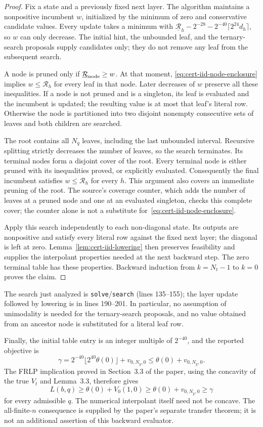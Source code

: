 \begin{proof}
Fix a state and a previously fixed next layer.  The algorithm maintains a
nonpositive incumbent $w$, initialized by the minimum of zero and
conservative candidate values.  Every update takes a minimum with
$\underline{\mathcal R}_h-2^{-28}-2^{-40}\lceil 2^{24}d_h\rceil$, so $w$ can only decrease.
The initial hint, the unbounded leaf, and the ternary-search proposals
supply candidates only; they do not remove any leaf from the subsequent
search.

A node is pruned only if
$\underline{\mathcal R}_{\rm node}\ge w$.  At that moment,
\eqref{eq:cert-iid-node-enclosure} implies $w\le\mathcal R_h$ for every
leaf in that node.  Later decreases of $w$ preserve all these inequalities.
If a node is not pruned and is a singleton, its leaf is evaluated and the
incumbent is updated; the resulting value is at most that leaf's literal
row.  Otherwise the node is partitioned into two disjoint nonempty
consecutive sets of leaves and both children are searched.

The root contains all $N_q$ leaves, including the last unbounded
interval.  Recursive splitting strictly decreases the number of leaves,
so the search terminates.  Its terminal nodes form a disjoint cover of
the root.  Every terminal node is either pruned with its inequalities
proved, or explicitly evaluated.  Consequently the final incumbent
satisfies $w\le\mathcal R_h$ for every $h$.  This argument also covers an
immediate pruning of the root.  The source's coverage counter, which
adds the number of leaves at a pruned node and one at an evaluated
singleton, checks this complete cover; the counter alone is not a
substitute for~\eqref{eq:cert-iid-node-enclosure}.

Apply this search independently to each non-diagonal state.  Its outputs
are nonpositive and satisfy every literal row against the fixed next
layer; the diagonal is left at zero.  Lemma~\ref{lem:cert-iid-lowering}
then preserves feasibility and supplies the interpolant properties
needed at the next backward step.  The zero terminal table has these
properties.  Backward induction from $k=N_t-1$ to $k=0$ proves the claim.
\end{proof}

The search just analyzed is \texttt{solve}/\texttt{search}
(lines 135--155); the layer update followed by lowering is in
lines 190--201.  In particular, no assumption of unimodality is needed
for the ternary-search proposals, and no value obtained from an ancestor
node is substituted for a literal leaf row.

Finally, the initial table entry is an integer multiple of $2^{-40}$,
and the reported objective is
\[
 \gamma
  =2^{-40}\lfloor2^{40}\theta(0)\rfloor+v_{0,N_y,0}
  \le\theta(0)+v_{0,N_y,0}.
\]
The FRLP implication proved in Section~3.3 of the paper, using the
concavity of the true $V_t$ and Lemma~3.3, therefore gives
\[
 L(b,q)\ge\theta(0)+V_0(1,0)
       \ge\theta(0)+v_{0,N_y,0}
       \ge\gamma
\]
for every admissible $q$.  The numerical interpolant itself need not be
concave.  The all-finite-$n$ consequence is supplied by the paper's
separate transfer theorem; it is not an additional assertion of this
backward evaluator.
